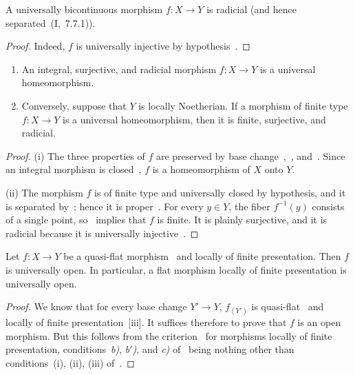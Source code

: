 \begin{proposition}[2.4.4]
\label{IV.2.4.4}
A universally bicontinuous morphism $f:X\to Y$ is radicial \textnormal{(}and hence separated~(I,~7.7.1)\textnormal{)}.
\end{proposition}

\begin{proof}
Indeed, $f$ is universally injective by hypothesis~.
\end{proof}

\begin{proposition}[2.4.5]
\label{IV.2.4.5}
\medskip\noindent
\begin{enumerate}
  \item[(i)] An integral, surjective, and radicial morphism $f:X\to Y$ is a universal homeomorphism.
  \item[(ii)] Conversely, suppose that $Y$ is locally Noetherian. If a morphism of finite type $f:X\to Y$ is a universal homeomorphism, then it is finite, surjective, and radicial.
\end{enumerate}
\end{proposition}

\begin{proof}
(i) The three properties of $f$ are preserved by base change~,~, and~. Since an integral morphism is closed~, $f$ is a homeomorphism of $X$ onto $Y$.

(ii) The morphism $f$ is of finite type and universally closed by hypothesis, and it is separated by~; hence it is proper~. For every $y\in Y$, the fiber $f^{-1}(y)$ consists of a single point, so~ implies that $f$ is finite. It is plainly surjective, and it is radicial because it is universally injective~.
\end{proof}

\begin{theorem}[2.4.6]
\label{IV.2.4.6}
Let $f:X\to Y$ be a quasi-flat morphism~ and locally of finite presentation.
Then $f$ is universally open.
In particular, a flat morphism locally of finite presentation is universally open.
\end{theorem}

\begin{proof}
We know that for every base change $Y'\to Y$, $f_{(Y')}$ is quasi-flat~ and locally of finite presentation~[iii].
It suffices therefore to prove that $f$ is an
open morphism.
But this follows from the criterion~ for morphisms locally of finite presentation, conditions~\emph{b)}, \emph{b$'$)}, and \emph{c)} of~ being nothing other than conditions~(i), (ii), (iii) of~.
\end{proof}

